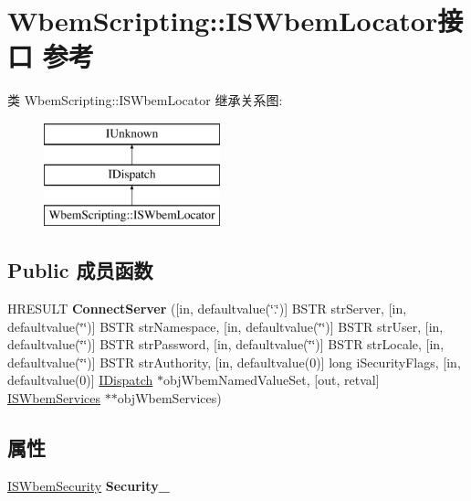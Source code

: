 \hypertarget{interface_wbem_scripting_1_1_i_s_wbem_locator}{}\section{Wbem\+Scripting\+:\+:I\+S\+Wbem\+Locator接口 参考}
\label{interface_wbem_scripting_1_1_i_s_wbem_locator}
类 Wbem\+Scripting\+:\+:I\+S\+Wbem\+Locator 继承关系图\+:\begin{figure}[H]
\begin{center}
\leavevmode
\includegraphics[height=3.000000cm]{interface_wbem_scripting_1_1_i_s_wbem_locator}
\end{center}
\end{figure}
\subsection*{Public 成员函数}
\begin{DoxyCompactItemize}
\item 
\mbox{\label{interface_wbem_scripting_1_1_i_s_wbem_locator_a51d27dd45973b55c47a839f25af681cf}} 
H\+R\+E\+S\+U\+LT {\bfseries Connect\+Server} (\mbox{[}in, defaultvalue(\char`\"{}.\char`\"{})\mbox{]} B\+S\+TR str\+Server, \mbox{[}in, defaultvalue(\char`\"{}\char`\"{})\mbox{]} B\+S\+TR str\+Namespace, \mbox{[}in, defaultvalue(\char`\"{}\char`\"{})\mbox{]} B\+S\+TR str\+User, \mbox{[}in, defaultvalue(\char`\"{}\char`\"{})\mbox{]} B\+S\+TR str\+Password, \mbox{[}in, defaultvalue(\char`\"{}\char`\"{})\mbox{]} B\+S\+TR str\+Locale, \mbox{[}in, defaultvalue(\char`\"{}\char`\"{})\mbox{]} B\+S\+TR str\+Authority, \mbox{[}in, defaultvalue(0)\mbox{]} long i\+Security\+Flags, \mbox{[}in, defaultvalue(0)\mbox{]} \hyperlink{interface_i_dispatch}{I\+Dispatch} $\ast$obj\+Wbem\+Named\+Value\+Set, \mbox{[}out, retval\mbox{]} \hyperlink{interface_wbem_scripting_1_1_i_s_wbem_services}{I\+S\+Wbem\+Services} $\ast$$\ast$obj\+Wbem\+Services)
\end{DoxyCompactItemize}
\subsection*{属性}
\begin{DoxyCompactItemize}
\item 
\mbox{\label{interface_wbem_scripting_1_1_i_s_wbem_locator_aa74869037563f4add79b309c49b96443}} 
\hyperlink{interface_wbem_scripting_1_1_i_s_wbem_security}{I\+S\+Wbem\+Security} {\bfseries Security\+\_\+}
\end{DoxyCompactItemize}
